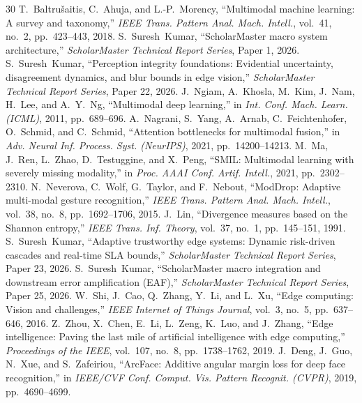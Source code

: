\documentclass[10pt,journal,compsoc]{IEEEtran}
\begin{document}
\begin{thebibliography}{30}
 T.~Baltru{\v{s}}aitis, C.~Ahuja, and L.-P.~Morency, ``Multimodal machine learning: A survey and taxonomy,'' \emph{IEEE Trans. Pattern Anal. Mach. Intell.}, vol.~41, no.~2, pp.~423--443, 2018.
 S.~Suresh~Kumar, ``ScholarMaster macro system architecture,'' \emph{ScholarMaster Technical Report Series}, Paper 1, 2026.
 S.~Suresh~Kumar, ``Perception integrity foundations: Evidential uncertainty, disagreement dynamics, and blur bounds in edge vision,'' \emph{ScholarMaster Technical Report Series}, Paper 22, 2026.
 J.~Ngiam, A.~Khosla, M.~Kim, J.~Nam, H.~Lee, and A.~Y.~Ng, ``Multimodal deep learning,'' in \emph{Int. Conf. Mach. Learn. (ICML)}, 2011, pp.~689--696.
 A.~Nagrani, S.~Yang, A.~Arnab, C.~Feichtenhofer, O.~Schmid, and C.~Schmid, ``Attention bottlenecks for multimodal fusion,'' in \emph{Adv. Neural Inf. Process. Syst. (NeurIPS)}, 2021, pp.~14200--14213.
 M.~Ma, J.~Ren, L.~Zhao, D.~Testuggine, and X.~Peng, ``SMIL: Multimodal learning with severely missing modality,'' in \emph{Proc. AAAI Conf. Artif. Intell.}, 2021, pp.~2302--2310.
 N.~Neverova, C.~Wolf, G.~Taylor, and F.~Nebout, ``ModDrop: Adaptive multi-modal gesture recognition,'' \emph{IEEE Trans. Pattern Anal. Mach. Intell.}, vol.~38, no.~8, pp.~1692--1706, 2015.
 J.~Lin, ``Divergence measures based on the Shannon entropy,'' \emph{IEEE Trans. Inf. Theory}, vol.~37, no.~1, pp.~145--151, 1991.
 S.~Suresh~Kumar, ``Adaptive trustworthy edge systems: Dynamic risk-driven cascades and real-time SLA bounds,'' \emph{ScholarMaster Technical Report Series}, Paper 23, 2026.
 S.~Suresh~Kumar, ``ScholarMaster macro integration and downstream error amplification (EAF),'' \emph{ScholarMaster Technical Report Series}, Paper 25, 2026.
 W.~Shi, J.~Cao, Q.~Zhang, Y.~Li, and L.~Xu, ``Edge computing: Vision and challenges,'' \emph{IEEE Internet of Things Journal}, vol.~3, no.~5, pp.~637--646, 2016.
 Z.~Zhou, X.~Chen, E.~Li, L.~Zeng, K.~Luo, and J.~Zhang, ``Edge intelligence: Paving the last mile of artificial intelligence with edge computing,'' \emph{Proceedings of the IEEE}, vol.~107, no.~8, pp.~1738--1762, 2019.
 J.~Deng, J.~Guo, N.~Xue, and S.~Zafeiriou, ``ArcFace: Additive angular margin loss for deep face recognition,'' in \emph{IEEE/CVF Conf. Comput. Vis. Pattern Recognit. (CVPR)}, 2019, pp.~4690--4699.

\end{thebibliography}
\end{document}
